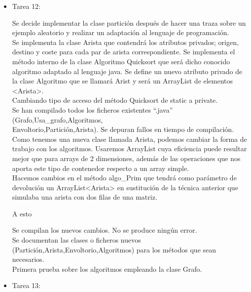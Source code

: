 \begin{itemize}
\item Tarea 12:

Se decide implementar la clase partición después de hacer una traza sobre un ejemplo aleatorio y realizar un adaptación al lenguaje de programación.\\

Se implementa la clase Arista que contendrá los atributos privados; origen, destino y coste para cada par de arista correspondiente. Se implementa el método interno de la clase Algoritmo Quicksort que será dicho conocido algoritmo adaptado al lenguaje java. Se define un nuevo atributo privado de la clase Algoritmo que se llamará Arist y será un ArrayList de elementos <Arista>.\\

Cambiando tipo de acceso del método Quicksort de static a private.\\

Se han compilado todos los ficheros existentes ``.java'' (Grafo,Usa\_grafo,Algoritmos,\\Envoltorio,Partición,Arista). 
Se depuran fallos en tiempo de compilación.\\

Como tenemos una nueva clase llamada Arista, podemos cambiar la forma de trabajo con los algoritmos. Usaremos ArrayList cuya eficiencia puede resultar mejor que para arrays de 2 dimensiones, además de las operaciones que nos aporta este tipo de contenedor respecto a un array simple.\\

Hacemos cambios en el método algo\_Prim que tendrá como parámetro de devolución un ArrayList<Arista> en sustitución de la técnica anterior que simulaba una arista con dos filas de una matriz.



A esto



Se compilan los nuevos cambios. No se produce ningún error.\\

Se documentan las clases o ficheros nuevos (Partición,Arista,Envoltorio,Algoritmos) para los métodos que sean necesarios.\\

Primera prueba sobre los algoritmos empleando la clase Grafo.\\

\item Tarea 13:


\end{itemize}
